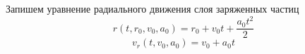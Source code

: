 ﻿\documentclass[12pt, letterpaper]{article}
\begin{document}






Запишем уравнение радиального движения слоя заряженных частиц
	\[r\left( t,{{r}_{0}},{{v}_{0}},{{a}_{0}} \right)={{r}_{0}}+{{v}_{0}}t+\frac{{{a}_{0}}{{t}^{2}}}{2}\] 	
	\[{{v}_{r}}\left( t,{{v}_{0}},{{a}_{0}} \right)={{v}_{0}}+{{a}_{0}}t\] 	
\end{document}
